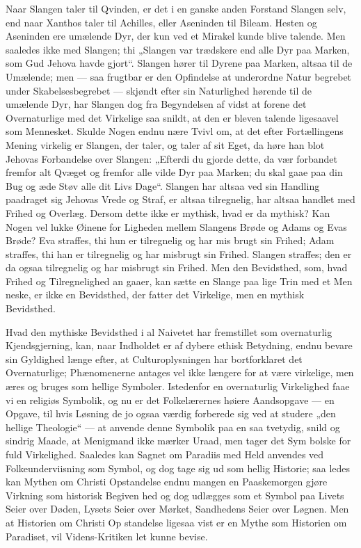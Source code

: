 \documentclass[12pt]{book}
\newcommand{\opage}[1]{\marginnote{\footnotesize\textit{[#1]}}}
\begin{document}
Naar Slangen taler til Qvinden, er det i en ganske
anden Forstand Slangen selv, end naar Xanthos taler
til Achilles, eller Aseninden til Bileam. Hesten og
Aseninden ere umælende Dyr, der kun ved et Mirakel
kunde blive talende. Men saaledes ikke med Slangen;
thi „Slangen var trædskere end alle Dyr paa Marken,
som Gud Jehova havde gjort“. Slangen hører til
Dyrene paa Marken, altsaa til de Umælende; men ---
saa frugtbar er den Opfindelse at underordne Natur\-%
begrebet under Skabelsesbegrebet --- skjøndt efter sin
Naturlighed hørende til de umælende Dyr, har Slangen
dog fra Begyndelsen af vidst at forene det Overnaturlige
med det Virkelige saa snildt, at den er bleven talende
\opage{163}\setcounter{footnote}{0}%
ligesaavel som Mennesket. Skulde Nogen endnu nære
Tvivl om, at det efter Fortællingens Mening virkelig
er Slangen, der taler, og taler af sit Eget, da høre
han blot Jehovas Forbandelse over Slangen: „Efterdi
du gjorde dette, da vær forbandet fremfor alt Qvæget
og fremfor alle vilde Dyr paa Marken; du skal gaae
paa din Bug og æde Støv alle dit Livs Dage“. Slangen
har altsaa ved sin Handling paadraget sig Jehovas Vrede
og Straf, er altsaa tilregnelig, har altsaa handlet med
Frihed og Overlæg. Dersom dette ikke er mythisk,
hvad er da mythisk? Kan Nogen vel lukke Øinene for
Ligheden mellem Slangens Brøde og Adams og Evas
Brøde? Eva straffes, thi hun er tilregnelig og har mis\-%
brugt sin Frihed; Adam straffes, thi han er tilregnelig
og har misbrugt sin Frihed. Slangen straffes; den er
da ogsaa tilregnelig og har misbrugt sin Frihed. Men
den Bevidsthed, som, hvad Frihed og Tilregnelighed an\-%
gaaer, kan sætte en Slange paa lige Trin med et Men\-%
neske, er ikke en Bevidsthed, der fatter det Virkelige,
men en mythisk Bevidsthed.

Hvad den mythiske Bevidsthed i al Naivetet har
fremstillet som overnaturlig Kjendsgjerning, kan, naar
Indholdet er af dybere ethisk Betydning, endnu bevare
sin Gyldighed længe efter, at Culturoplysningen har
bortforklaret det Overnaturlige; Phænomenerne antages
vel ikke længere for at være virkelige, men æres og
bruges som hellige Symboler. Istedenfor en overnaturlig
Virkelighed faae vi en religiøs Symbolik, og nu er det
Folkelærernes høiere Aandsopgave --- en Opgave, til
hvis Løsning de jo ogsaa værdig forberede sig ved at
studere „den hellige Theologie“ --- at anvende denne
Symbolik paa en saa tvetydig, snild og sindrig Maade,
at Menigmand ikke mærker Uraad, men tager det Sym\-%
bolske for fuld Virkelighed. Saaledes kan Sagnet om
\opage{164}\setcounter{footnote}{0}%
Paradiis med Held anvendes ved Folkeunderviisning som
Symbol, og dog tage sig ud som hellig Historie; saa\-%
ledes kan Mythen om Christi Opstandelse endnu mangen
en Paaskemorgen gjøre Virkning som historisk Begiven\-%
hed og dog udlægges som et Symbol paa Livets Seier
over Døden, Lysets Seier over Mørket, Sandhedens
Seier over Løgnen. Men at Historien om Christi Op\-%
standelse ligesaa vist er en Mythe som Historien om
Paradiset, vil Videns-Kritiken let kunne bevise.
\end{document}
